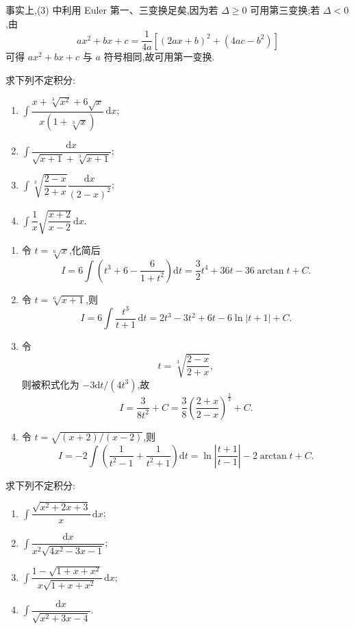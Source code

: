 \begin{remark}
    事实上,(3) 中利用 Euler 第一、三变换足矣,因为若 $\Delta\geq0$ 可用第三变换;若 $\Delta<0$,由
    \[
        ax^2+bx+c=\dfrac{1}{4a}\left[(2ax+b)^2+(4ac-b^2)\right]
    \]
    可得 $ax^2+bx+c$ 与 $a$ 符号相同,故可用第一变换.
\end{remark}

\begin{example}
    求下列不定积分:
    \begin{enumerate}
        \item $\displaystyle\int\dfrac{x+\sqrt[3]{x^2}+6\sqrt{x}}{x(1+\sqrt[3]{x})}\,\mathrm{d}x$;
        \item $\displaystyle\int\dfrac{\mathrm{d}x}{\sqrt{x+1}+\sqrt[3]{x+1}}$;
        \item $\displaystyle\int\sqrt[3]{\dfrac{2-x}{2+x}}\dfrac{\mathrm{d}x}{(2-x)^2}$;
        \item $\displaystyle\int\dfrac{1}{x}\sqrt{\dfrac{x+2}{x-2}}\,\mathrm{d}x$.
    \end{enumerate}
\end{example}
\exampleblank

\begin{solution}
    \begin{enumerate}
        \item 令 $t=\sqrt[6]{x}$,化简后
              \[
                  I=6\int\left(t^3+6-\dfrac{6}{1+t^2}\right)\mathrm{d}t
                  =\dfrac{3}{2}t^4+36t-36\arctan t+C.
              \]
        \item 令 $t=\sqrt[6]{x+1}$,则
              \[
                  I=6\int\dfrac{t^3}{t+1}\,\mathrm{d}t
                  =2t^3-3t^2+6t-6\ln|t+1|+C.
              \]
        \item 令
              \[
                  t=\sqrt[3]{\dfrac{2-x}{2+x}},
              \]
              则被积式化为 $-3\mathrm{d}t/(4t^3)$,故
              \[
                  I=\dfrac{3}{8t^2}+C
                  =\dfrac{3}{8}\left(\dfrac{2+x}{2-x}\right)^{\frac{2}{3}}+C.
              \]
        \item 令 $t=\sqrt{(x+2)/(x-2)}$,则
              \[
                  I=-2\int\left(\dfrac{1}{t^2-1}+\dfrac{1}{t^2+1}\right)\mathrm{d}t
                  =\ln\left|\dfrac{t+1}{t-1}\right|-2\arctan t+C.
              \]
    \end{enumerate}
\end{solution}

\begin{example}
    求下列不定积分:
    \begin{enumerate}
        \item $\displaystyle\int\dfrac{\sqrt{x^2+2x+3}}{x}\,\mathrm{d}x$;
        \item $\displaystyle\int\dfrac{\mathrm{d}x}{x^2\sqrt{4x^2-3x-1}}$;
        \item $\displaystyle\int\dfrac{1-\sqrt{1+x+x^2}}{x\sqrt{1+x+x^2}}\,\mathrm{d}x$;
        \item $\displaystyle\int\dfrac{\mathrm{d}x}{\sqrt{x^2+3x-4}}$.
    \end{enumerate}
\end{example}
\exampleblank

